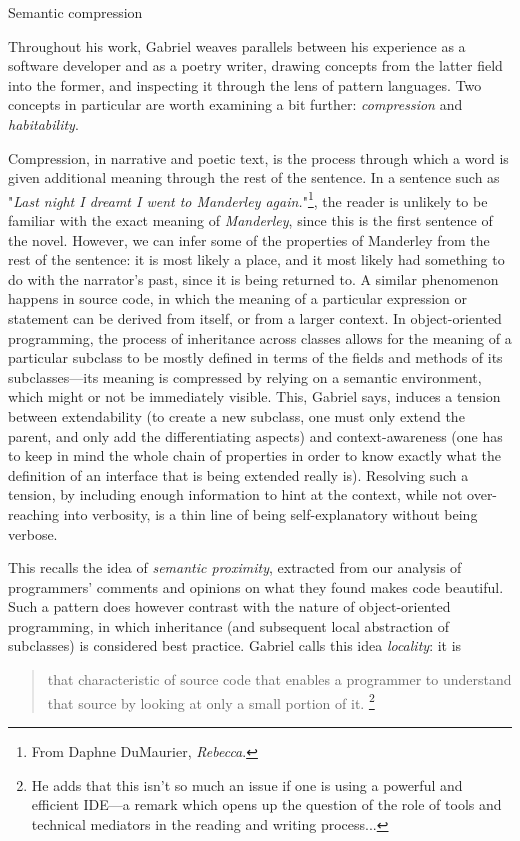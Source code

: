 Semantic compression

Throughout his work, Gabriel weaves parallels between his experience as a software developer and as a poetry writer, drawing concepts from the latter field into the former, and inspecting it through the lens of pattern languages. Two concepts in particular are worth examining a bit further: \emph{compression} and \emph{habitability}.

Compression, in narrative and poetic text, is the process through which a word is given additional meaning through the rest of the sentence. In a sentence such as "\emph{Last night I dreamt I went to Manderley again.}"\footnote{From Daphne DuMaurier, \emph{Rebecca}.}, the reader is unlikely to be familiar with the exact meaning of \emph{Manderley}, since this is the first sentence of the novel. However, we can infer some of the properties of Manderley from the rest of the sentence: it is most likely a place, and it most likely had something to do with the narrator's past, since it is being returned to. A similar phenomenon happens in source code, in which the meaning of a particular expression or statement can be derived from itself, or from a larger context. In object-oriented programming, the process of inheritance across classes allows for the meaning of a particular subclass to be mostly defined in terms of the fields and methods of its subclasses—its meaning is compressed by relying on a semantic environment, which might or not be immediately visible. This, Gabriel says, induces a tension between extendability (to create a new subclass, one must only extend the parent, and only add the differentiating aspects) and context-awareness (one has to keep in mind the whole chain of properties in order to know exactly what the definition of an interface that is being extended really is). Resolving such a tension, by including enough information to hint at the context, while not over-reaching into verbosity, is a thin line of being self-explanatory without being verbose.

This recalls the idea of \emph{semantic proximity}, extracted from our analysis of programmers' comments and opinions on what they found makes code beautiful. Such a pattern does however contrast with the nature of object-oriented programming, in which inheritance (and subsequent local abstraction of subclasses) is considered best practice. Gabriel calls this idea \emph{locality}: it is 

\begin{quote}
  that characteristic of source code that enables a programmer to understand that source by looking at only a small portion of it. \citep{gabriel_patterns_1998}\footnote{He adds that this isn't so much an issue if one is using a powerful and efficient IDE—a remark which opens up the question of the role of tools and technical mediators in the reading and writing process...}
\end{quote}

